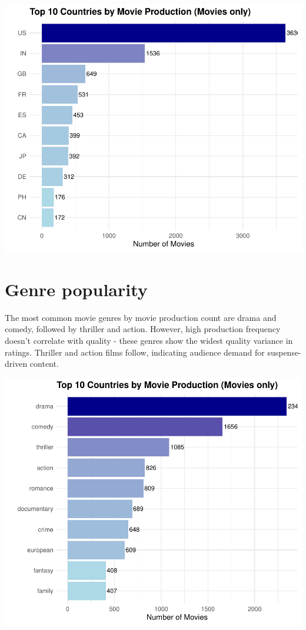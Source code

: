 \documentclass[11pt,preprint]{elsarticle}
\numberwithin{equation}{section}
\numberwithin{figure}{section}
\numberwithin{table}{section}
\begin{document}
\begin{center}\includegraphics[width=0.8\linewidth]{Question3_files/figure-latex/unnamed-chunk-1-1} \end{center}
\newpage

\section{Genre popularity}\label{genre-popularity}

The most common movie genres by movie production count are drama and
comedy, followed by thriller and action. However, high production
frequency doesn't correlate with quality - these genres show the widest
quality variance in ratings. Thriller and action films follow,
indicating audience demand for suspense-driven content.

\begin{center}\includegraphics[width=0.8\linewidth]{Question3_files/figure-latex/unnamed-chunk-2-1} \end{center}
\end{document}
